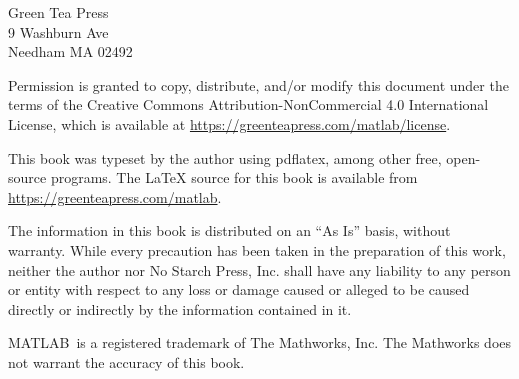 \vspace{0.2in}

\begin{flushleft}
Green Tea Press       \\
9 Washburn Ave \\
Needham MA 02492
\end{flushleft}

Permission is granted to copy, distribute, and/or modify this document under the terms of the Creative Commons Attribution-NonCommercial 4.0 International License, which is available at \url{https://greenteapress.com/matlab/license}.

This book was typeset by the author using pdflatex, among other free, open-source programs.
 The LaTeX source for this book is available from \url{https://greenteapress.com/matlab}.

 The information in this book is distributed on an ``As Is'' basis,
without warranty. While every precaution has been taken in the
preparation of this work, neither the author nor No Starch Press, Inc.
shall have any liability to any person or entity with respect to any
loss or damage caused or alleged to be caused directly or indirectly
by the information contained in it.

MATLAB\myreg\ is a registered trademark of The Mathworks, Inc.  The Mathworks does not warrant the accuracy  of this book.
